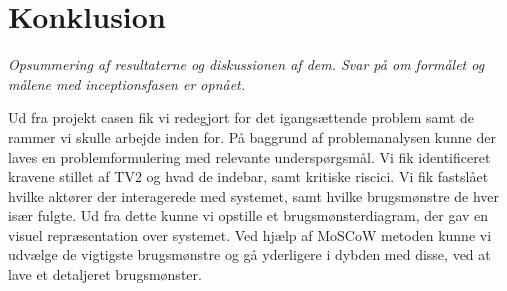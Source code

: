 \section{Konklusion}
\textit{Opsummering af resultaterne og diskussionen af dem. Svar på om formålet og målene med inceptionsfasen er opnået.}

Ud fra projekt casen fik vi redegjort for det igangsættende problem samt de rammer vi skulle arbejde inden for. På baggrund af problemanalysen kunne der laves en problemformulering med relevante underspørgsmål. Vi fik identificeret kravene stillet af TV2 og hvad de indebar, samt kritiske riscici. Vi fik fastslået hvilke aktører der interagerede med systemet, samt hvilke brugsmønstre de hver især fulgte. Ud fra dette kunne vi opstille et brugsmønsterdiagram, der gav en visuel repræsentation over systemet.
Ved hjælp af MoSCoW metoden kunne vi udvælge de vigtigste brugsmønstre og gå yderligere i dybden med disse, ved at lave et detaljeret brugsmønster.
